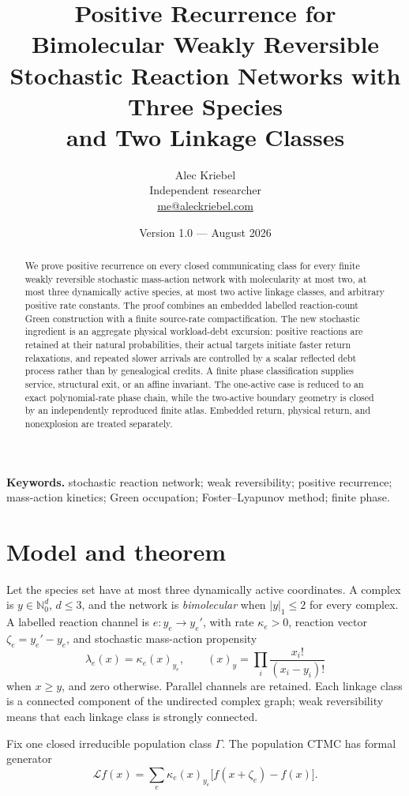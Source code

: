 \documentclass[11pt]{article}
\title{Positive Recurrence for Bimolecular Weakly Reversible\\
Stochastic Reaction Networks with Three Species\\
and Two Linkage Classes}
\author{Alec Kriebel\\\small Independent researcher\\
\small\href{mailto:me@aleckriebel.com}{me@aleckriebel.com}}
\date{Version 1.0 --- August 2026}
\newcommand{\N}{\mathbb N_0}
\newcommand{\cL}{\mathcal L}
\begin{document}
\maketitle

\begin{abstract}
We prove positive recurrence on every closed communicating class for every
finite weakly reversible stochastic mass-action network with molecularity at
most two, at most three dynamically active species, at most two active
linkage classes, and arbitrary positive rate constants.  The proof combines
an embedded labelled reaction-count Green construction with a finite
source-rate compactification.  The new stochastic ingredient is an aggregate
physical workload-debt excursion: positive reactions are retained at their
natural probabilities, their actual targets initiate faster return
relaxations, and repeated slower arrivals are controlled by a scalar reflected
debt process rather than by genealogical credits.  A finite phase
classification supplies service, structural exit, or an affine invariant.
The one-active case is reduced to an exact polynomial-rate phase chain, while
the two-active boundary geometry is closed by an independently reproduced
finite atlas.  Embedded return, physical return, and nonexplosion are treated
separately.
\end{abstract}

\noindent\textbf{Keywords.}
stochastic reaction network; weak reversibility; positive recurrence;
mass-action kinetics; Green occupation; Foster--Lyapunov method; finite phase.

\section{Model and theorem}

Let the species set have at most three dynamically active coordinates.  A
complex is \(y\in\N^d\), \(d\le3\), and the network is
\emph{bimolecular} when \(|y|_1\le2\) for every complex.  A labelled reaction
channel is \(e:y_e\to y_e'\), with rate \(\kappa_e>0\), reaction vector
\(\zeta_e=y_e'-y_e\), and stochastic mass-action propensity
\[
 \lambda_e(x)=\kappa_e(x)_{y_e},\qquad
 (x)_y=\prod_i\frac{x_i!}{(x_i-y_i)!}
\]
when \(x\ge y\), and zero otherwise.  Parallel channels are retained.
Each linkage class is a connected component of the undirected complex graph;
weak reversibility means that each linkage class is strongly connected.

Fix one closed irreducible population class \(\Gamma\).  The population CTMC
has formal generator
\[
 \cL f(x)=\sum_e\kappa_e(x)_{y_e}
 \bigl[f(x+\zeta_e)-f(x)\bigr].
\]
\end{document}
